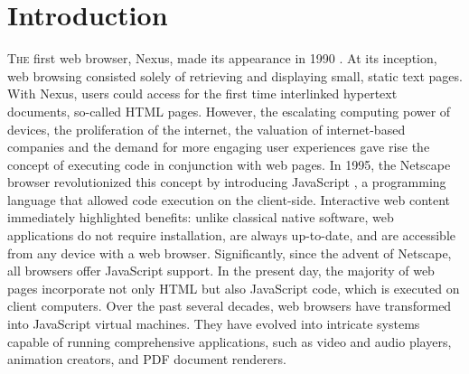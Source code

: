 
\chapter{Introduction}
\label{Intro}


\lettrine[lines=3]{T}{he} first web browser, Nexus, made its appearance in 1990 \cite{nexus}.  
At its inception, web browsing consisted solely of retrieving and displaying small, static text pages. 
With Nexus, users could access for the first time interlinked hypertext documents, so-called HTML pages. 
However, the escalating computing power of devices, the proliferation of the internet, the valuation of internet-based companies and the demand for more engaging user experiences gave rise the concept of executing code in conjunction with web pages. 
In 1995, the Netscape browser revolutionized this concept by introducing JavaScript \cite{10.1007/978-3-642-14107-2_7}, a programming language that allowed code execution on the client-side.
Interactive web content immediately highlighted benefits: unlike classical native software, web applications do not require installation, are always up-to-date, and are accessible from any device with a web browser. 
Significantly, since the advent of Netscape, all browsers offer JavaScript support. 
In the present day, the majority of web pages incorporate not only HTML but also JavaScript code, which is executed on client computers. 
Over the past several decades, web browsers have transformed into JavaScript virtual machines. 
They have evolved into intricate systems capable of running comprehensive applications, such as video and audio players, animation creators, and PDF document renderers.


